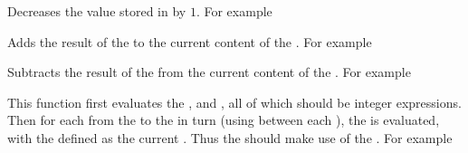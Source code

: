 \documentclass[oneside]{book}
\begin{document}
\begin{function}{\IntDecr}
\begin{syntax}
 
\end{syntax}
Decreases the value stored in  by $1$.
For example
\begin{demo}
\IntSet{}
\IntDecr\lTmpaInt
\IntUse\lTmpaInt
\end{demo}
\end{function}

\begin{function}{\IntAdd}
\begin{syntax}
  
\end{syntax}
Adds the result of the  to the current
content of the . For example
\begin{demo}
\IntSet{}
\IntAdd{}
\IntUse\lTmpaInt
\end{demo}
\end{function}

\begin{function}{\IntSub}
\begin{syntax}
  
\end{syntax}
Subtracts the result of the  from the
current content of the . For example
\begin{demo}
\IntSet{}
\IntSub{}
\IntUse\lTmpaInt
\end{demo}
\end{function}

\begin{function}{\IntStepVariable}
\begin{syntax}
     
\end{syntax}
This function first evaluates the , 
and , all of which should be integer expressions.
Then for each  from the  to the
 in turn (using  between each
), the  is evaluated,
with the  defined as the current .  Thus
the  should make use of the .
For example
\begin{demo}
\TlClear\lTmpaTl
{}\lTmpiTl{
  \TlPutRight\lTmpaTl{\Value\lTmpiTl}
  \TlPutRight\lTmpaTl{ }
}
\Result{\Value\lTmpaTl}
\end{demo}
\end{function}
\end{document}
